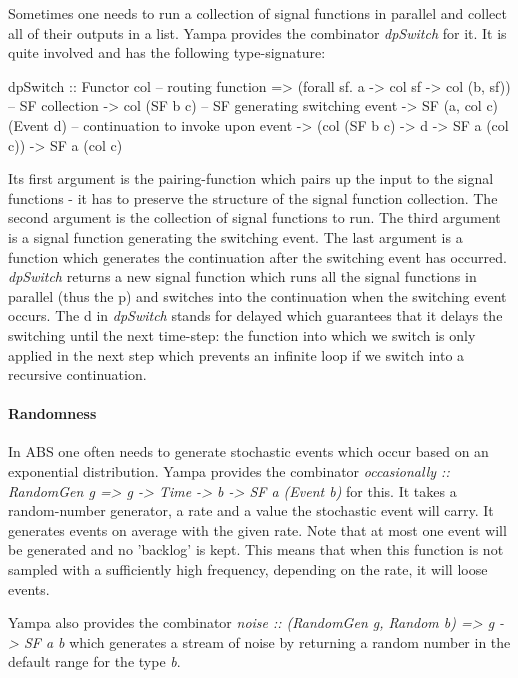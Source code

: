 Sometimes one needs to run a collection of signal functions in parallel and collect all of their outputs in a list. Yampa provides the combinator \textit{dpSwitch} for it. It is quite involved and has the following type-signature:

\begin{HaskellCode}
dpSwitch :: Functor col
         -- routing function
         => (forall sf. a -> col sf -> col (b, sf))
         -- SF collection
         -> col (SF b c)
         -- SF generating switching event     
         -> SF (a, col c) (Event d)
         -- continuation to invoke upon event           
         -> (col (SF b c) -> d -> SF a (col c))
         -> SF a (col c)
\end{HaskellCode}

Its first argument is the pairing-function which pairs up the input to the signal functions - it has to preserve the structure of the signal function collection. The second argument is the collection of signal functions to run. The third argument is a signal function generating the switching event. The last argument is a function which generates the continuation after the switching event has occurred. \textit{dpSwitch} returns a new signal function which runs all the signal functions in parallel (thus the p) and switches into the continuation when the switching event occurs. The d in \textit{dpSwitch} stands for delayed which guarantees that it delays the switching until the next time-step: the function into which we switch is only applied in the next step which prevents an infinite loop if we switch into a recursive continuation.

\paragraph{Randomness}
In ABS one often needs to generate stochastic events which occur based on an exponential distribution. Yampa provides the combinator \textit{occasionally :: RandomGen g => g -> Time -> b -> SF a (Event b)} for this. It takes a random-number generator, a rate and a value the stochastic event will carry. It generates events on average with the given rate. Note that at most one event will be generated and no 'backlog' is kept. This means that when this function is not sampled with a sufficiently high frequency, depending on the rate, it will loose events.

Yampa also provides the combinator \textit{noise :: (RandomGen g, Random b) => g -> SF a b} which generates a stream of noise by returning a random number in the default range for the type \textit{b}.

